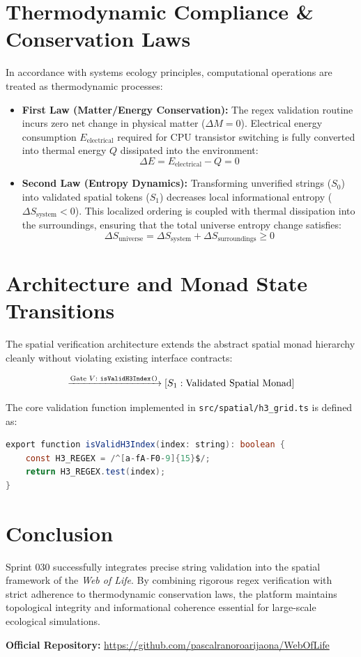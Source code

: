 \documentclass[11pt, a4paper]{article}
\begin{document}
\section{Thermodynamic Compliance \& Conservation Laws}
In accordance with systems ecology principles, computational operations are treated as thermodynamic processes:
\begin{itemize}
    \item \textbf{First Law (Matter/Energy Conservation):} The regex validation routine incurs zero net change in physical matter ($\Delta M = 0$). Electrical energy consumption $E_{\text{electrical}}$ required for CPU transistor switching is fully converted into thermal energy $Q$ dissipated into the environment:
    \begin{equation}
        \Delta E = E_{\text{electrical}} - Q = 0
    \end{equation}
    \item \textbf{Second Law (Entropy Dynamics):} Transforming unverified strings ($S_0$) into validated spatial tokens ($S_1$) decreases local informational entropy ($\Delta S_{\text{system}} < 0$). This localized ordering is coupled with thermal dissipation into the surroundings, ensuring that the total universe entropy change satisfies:
    \begin{equation}
        \Delta S_{\text{universe}} = \Delta S_{\text{system}} + \Delta S_{\text{surroundings}} \ge 0
    \end{equation}
\end{itemize}

\section{Architecture and Monad State Transitions}
The spatial verification architecture extends the abstract spatial monad hierarchy cleanly without violating existing interface contracts:

\begin{equation}
    [S_0: \text{Unverified String}] \xrightarrow{\text{Gate } V: \text{ \texttt{isValidH3Index()}}} [S_1: \text{Validated Spatial Monad}]
\end{equation}

The core validation function implemented in \texttt{src/spatial/h3\_grid.ts} is defined as:
\begin{lstlisting}[language=Java]
export function isValidH3Index(index: string): boolean {
    const H3_REGEX = /^[a-fA-F0-9]{15}$/;
    return H3_REGEX.test(index);
}
\end{lstlisting}

\section{Conclusion}
Sprint 030 successfully integrates precise string validation into the spatial framework of the \textit{Web of Life}. By combining rigorous regex verification with strict adherence to thermodynamic conservation laws, the platform maintains topological integrity and informational coherence essential for large-scale ecological simulations.

\vspace{1em}
\noindent\textbf{Official Repository:} \url{https://github.com/pascalranoroarijaona/WebOfLife}
\end{document}
